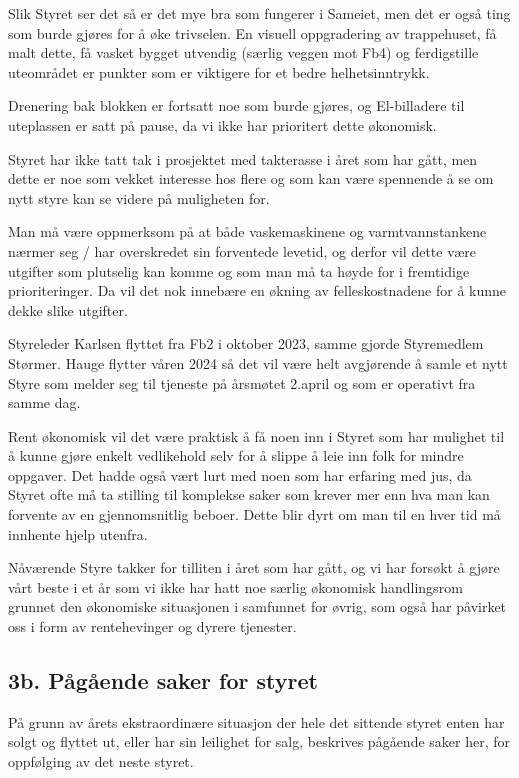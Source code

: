 \documentclass[12pt]{article}
\begin{document}
Slik Styret ser det så er det mye bra som fungerer i Sameiet, men det er også ting som burde gjøres
for å øke trivselen. En visuell oppgradering av trappehuset, få malt dette, få vasket bygget
utvendig (særlig veggen mot Fb4) og ferdigstille uteområdet er punkter som er viktigere for et
bedre helhetsinntrykk.

Drenering bak blokken er fortsatt noe som burde gjøres, og El-billadere til uteplassen er satt på
pause, da vi ikke har prioritert dette økonomisk.

Styret har ikke tatt tak i prosjektet med takterasse i året som har gått, men dette er noe som
vekket interesse hos flere og som kan være spennende å se om nytt styre kan se videre på muligheten
for.

Man må være oppmerksom på at både vaskemaskinene og varmtvannstankene nærmer seg / har overskredet
sin forventede levetid, og derfor vil dette være utgifter som plutselig kan komme og som man må ta
høyde for i fremtidige prioriteringer. Da vil det nok innebære en økning av felleskostnadene for å
kunne dekke slike utgifter.

Styreleder Karlsen flyttet fra Fb2 i oktober 2023, samme gjorde Styremedlem Størmer. Hauge flytter
våren 2024 så det vil være helt avgjørende å samle et nytt Styre som melder seg til tjeneste på
årsmøtet 2.april og som er operativt fra samme dag.

Rent økonomisk vil det være praktisk å få noen inn i Styret som har mulighet til å kunne gjøre
enkelt vedlikehold selv for å slippe å leie inn folk for mindre oppgaver. Det hadde også vært lurt
med noen som har erfaring med jus, da Styret ofte må ta stilling til komplekse saker som krever mer
enn hva man kan forvente av en gjennomsnitlig beboer. Dette blir dyrt om man til en hver tid må
innhente hjelp utenfra.

Nåværende Styre takker for tilliten i året som har gått, og vi har forsøkt å gjøre vårt beste i et
år som vi ikke har hatt noe særlig økonomisk handlingsrom grunnet den økonomiske situasjonen i
samfunnet for øvrig, som også har påvirket oss i form av rentehevinger og dyrere tjenester.

\subsection*{3b. Pågående saker for styret}

På grunn av årets ekstraordinære situasjon der hele det sittende styret enten har solgt og flyttet
ut, eller har sin leilighet for salg, beskrives pågående saker her, for oppfølging av det neste
styret.
\end{document}
